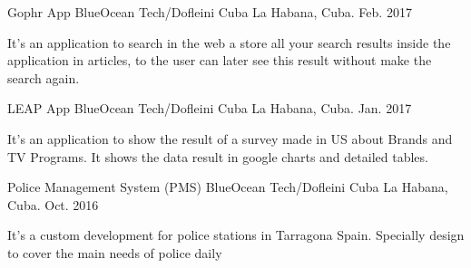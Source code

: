 


\begin{cventries}


\cventry
{Gophr App} %
{BlueOcean Tech/Dofleini Cuba} %
{La Habana, Cuba.} %
{Feb. 2017} %
{ %
\begin{cvitems}
\item {It’s an application to search in the web a store all your search results inside the application in articles, to the user can later see this
       result without make the search again.}
\end{cvitems}
}


\cventry
{LEAP App} %
{BlueOcean Tech/Dofleini Cuba} %
{La Habana, Cuba.} %
{Jan. 2017} %
{ %
\begin{cvitems}
\item {It’s an application to show the result of a survey made in US about Brands and TV Programs. It shows the data result in google charts
       and detailed tables.}
\end{cvitems}
}


\cventry
{Police Management System (PMS)} %
{BlueOcean Tech/Dofleini Cuba} %
{La Habana, Cuba.} %
{Oct. 2016} %
{ %
\begin{cvitems}
\item {It’s a custom development for police stations in Tarragona Spain. Specially design to cover the main needs of police daily}
\end{cvitems}
}



\end{cventries}
